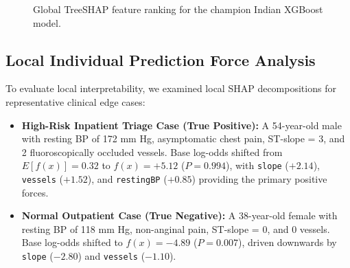 \documentclass[conference]{IEEEtran}
\begin{document}
\begin{figure}[htbp]
\centering
{}
\caption{Global TreeSHAP feature ranking for the champion Indian XGBoost model.}
\label{fig:shap_summary}
\end{figure}

\subsection{Local Individual Prediction Force Analysis}
To evaluate local interpretability, we examined local SHAP decompositions for representative clinical edge cases:
\begin{itemize}
    \item \textbf{High-Risk Inpatient Triage Case (True Positive):} A 54-year-old male with resting BP of 172 mm Hg, asymptomatic chest pain, ST-slope = 3, and 2 fluoroscopically occluded vessels. Base log-odds shifted from $E[f(x)] = 0.32$ to $f(x) = +5.12$ ($P = 0.994$), with \texttt{slope} ($+2.14$), \texttt{vessels} ($+1.52$), and \texttt{restingBP} ($+0.85$) providing the primary positive forces.
    \item \textbf{Normal Outpatient Case (True Negative):} A 38-year-old female with resting BP of 118 mm Hg, non-anginal pain, ST-slope = 0, and 0 vessels. Base log-odds shifted to $f(x) = -4.89$ ($P = 0.007$), driven downwards by \texttt{slope} ($-2.80$) and \texttt{vessels} ($-1.10$).
\end{itemize}
\end{document}

